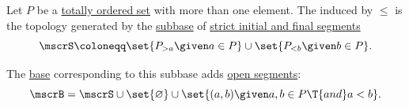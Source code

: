 \begin{definition}\label{def:order_topology}
  Let \( P \) be a \hyperref[def:partially_ordered_set]{totally ordered set} with more than one element. The  induced by \( \leq \) is the topology generated by the \hyperref[def:topological_subbase]{subbase} of \hyperref[def:order_interval/unbounded]{strict initial and final segments}
  \begin{equation}\label{eq:def:order_topology/subbase}
    \mscrS \coloneqq \set{ P_{>a} \given a \in P } \cup \set{ P_{<b} \given b \in P }.
  \end{equation}

  The \hyperref[def:topological_base]{base} corresponding to this subbase adds \hyperref[def:order_interval/open]{open segments}:
  \begin{equation}\label{eq:def:order_topology/base}
    \mscrB = \mscrS \cup \set{ \varnothing } \cup \set{ (a, b) \given a, b \in P \T{and} a < b }.
  \end{equation}
\end{definition}
